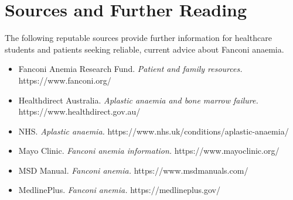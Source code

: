 \section*{Sources and Further Reading}
The following reputable sources provide further information for healthcare students and patients seeking reliable, current advice about Fanconi anaemia.
\begin{itemize}
    \item Fanconi Anemia Research Fund. \textit{Patient and family resources.} https://www.fanconi.org/
    \item Healthdirect Australia. \textit{Aplastic anaemia and bone marrow failure.} https://www.healthdirect.gov.au/
    \item NHS. \textit{Aplastic anaemia.} https://www.nhs.uk/conditions/aplastic-anaemia/
    \item Mayo Clinic. \textit{Fanconi anemia information.} https://www.mayoclinic.org/
    \item MSD Manual. \textit{Fanconi anemia.} https://www.msdmanuals.com/
    \item MedlinePlus. \textit{Fanconi anemia.} https://medlineplus.gov/
\end{itemize}
